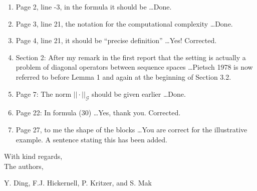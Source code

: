 \documentclass[11pt]{article}
\newcommand{\Response}[1]{{\color{blue}#1}}
\begin{document}
\begin{enumerate}

\renewcommand{\labelenumi}{\alph{enumi})} 
\item Page 2, line -3, in the formula it should be \ldots \Response{Done.}

\item  Page 3, line 21, the notation for the computational complexity \ldots  \Response{Done.}

\item  Page 4, line 21, it should be “precise definition” \ldots \Response{Yes!  Corrected.}


\item Section 2: After my remark in the first report that the setting is actually a problem of diagonal operators between sequence spaces \ldots \Response{Pietsch 1978 is now referred to before Lemma 1 and again at the beginning of Section 3.2.}

\item Page 7: The norm $||\cdot ||_{\mathcal{G}}$ should be given earlier \ldots \Response{Done.}

\item Page 22: In formula (30) \ldots \Response{Yes, thank you.  Corrected.}

\item  Page 27, to me the shape of the blocks \ldots \Response{You are correct for the illustrative example.  A sentence stating this has been added.}

\end{enumerate}

\bigskip 

\bigskip

\noindent With kind regards,\\[0.25cm]
The authors, 

\noindent Y. Ding, F.J. Hickernell, P. Kritzer, and S. Mak
\end{document}
